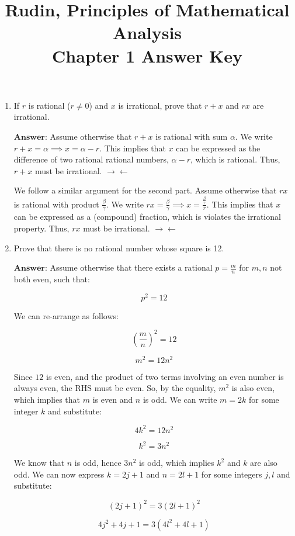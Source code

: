 \documentclass[12pt]{article}
\title{Rudin, Principles of Mathematical Analysis\\Chapter 1 Answer Key}
\date{}
\begin{document}
\maketitle

\begin{enumerate}
    \item If $r$ is rational ($r \neq 0$) and $x$ is irrational, prove that $r + x$ and $rx$ are irrational.
    
    $\textbf{Answer:}$ Assume otherwise that $r + x$ is rational with sum $\alpha$. We write $r + x = \alpha \implies x = \alpha - r$. This implies that $x$
    can be expressed as the difference of two rational rational numbers, $\alpha - r$, which is rational. Thus, $r + x$ must be irrational. $\rightarrow \leftarrow$

    We follow a similar argument for the second part. Assume otherwise that $rx$ is rational with product $\frac{\beta}{\gamma}$. We write $rx = \frac{\beta}{\gamma} \implies x = \frac{\frac{\beta}{\gamma}}{r}$. This
    implies that $x$ can be expressed as a (compound) fraction, which is violates the irrational property. Thus, $rx$ must be irrational. $\rightarrow \leftarrow$

    \item Prove that there is no rational number whose square is 12.
    
    $\textbf{Answer:}$ Assume otherwise that there exists a rational $p = \frac{m}{n}$ for $m,n$ not both even, such that:

    \[p^2 = 12\]

    We can re-arrange as follows:
    
    \[\left(\frac{m}{n}\right)^2 = 12\]

    \[m^2 = 12n^2\]

    Since $12$ is even, and the product of two terms involving an even number is always even, the RHS must be even.
    So, by the equality, $m^2$ is also even, which implies that $m$ is even and $n$ is odd.
    We can write $m = 2k$ for some integer $k$ and substitute:

    \[4k^2 = 12n^2\]

    \[k^2 = 3n^2\]

    We know that $n$ is odd, hence $3n^2$ is odd, which implies $k^2$ and $k$ are also odd. We can now express $k = 2j + 1$ and $n = 2l + 1$ for some integers $j, l$ and substitute:

    \[\left(2j + 1\right)^2 = 3\left(2l + 1\right)^2\]

    \[4j^2 + 4j + 1 = 3\left(4l^2 + 4l + 1\right)\]


\end{enumerate}
\end{document}
